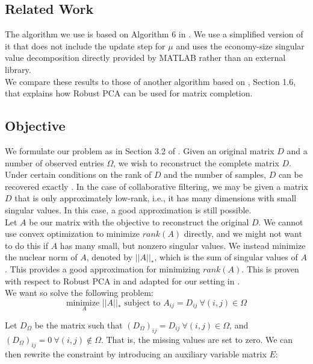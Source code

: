 \documentclass[10pt,conference,compsocconf]{IEEEtran}
\begin{document}
\subsection{Related Work}

The algorithm we use is based on Algorithm 6 in \cite{almpaper}.
We use a simplified version of it that does not include the update step
for $\mu$ and uses the economy-size singular value decomposition directly
provided by MATLAB rather than an external library. \\

We compare these results to those of another algorithm based on \cite{rpcapaper},
Section 1.6, that explains how Robust PCA can be used for matrix completion. \\

\subsection{Objective}

We formulate our problem as in Section 3.2 of \cite{almpaper}. Given an original matrix $D$ and
a number of observed entries $\Omega$, we wish to reconstruct the complete matrix $D$. Under certain
conditions on the rank of $D$ and the number of samples, $D$ can be recovered exactly \cite{exactpaper}. 
In the case of collaborative filtering, we may be given a matrix $D$ that is only
approximately low-rank, i.e., it has many dimensions with small singular values. In this case, a good approximation
is still possible. \\

Let $A$ be our matrix with the objective to reconstruct the original $D$. We cannot use convex optimization to minimize $rank(A)$ directly, and we might not want to do this if $A$ has many small, but nonzero singular values. We instead minimize the nuclear norm of $A$, denoted by $||A||_*$, which is the sum of singular values of $A$. This provides a good approximation for minimizing $rank(A)$. This is proven with respect to Robust PCA in \cite{rpcapaper} and adapted for our setting in \cite{almpaper}. \\

We want so solve the following problem: 
$$ \underset{A}{\text{minimize }} ||A||_* \text{ subject to  } A_{ij} = D_{ij} \ \forall(i, j) \in \Omega$$

Let $D_{\Omega}$ be the matrix such that $(D_{\Omega})_{ij} = D_{ij} \ \forall(i, j) \in \Omega$, and $(D_{\Omega})_{ij} = 0 \ \forall(i, j) \notin \Omega$. That is, the missing values are set to zero. We can then rewrite the constraint by introducing an auxiliary variable matrix $E$:
\end{document}
